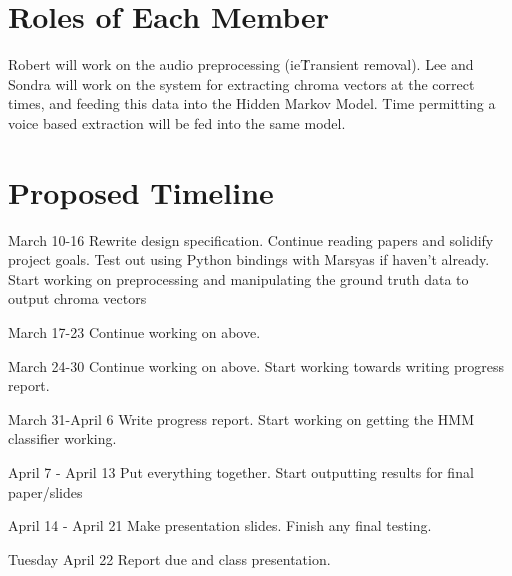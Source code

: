 \documentclass{article}
\begin{document}
\section{Roles of Each Member}

Robert will work on the audio preprocessing (ie\. Transient removal).  Lee and
Sondra will work on the system for extracting chroma vectors at the correct
times, and feeding this data into the Hidden Markov Model. Time permitting a
voice based extraction will be fed into the same model.

\section{Proposed Timeline}\label{sec:timeline}

March 10-16\newline
Rewrite design specification. Continue reading papers and solidify project
goals. Test out using Python bindings with Marsyas if haven't already. Start
working on preprocessing and manipulating the ground truth data to output
chroma vectors
\newline
\newline

March 17-23\newline
Continue working on above.
\newline
\newline

March 24-30\newline
Continue working on above. Start working towards writing progress report.
\newline
\newline

March 31-April 6\newline
Write progress report. Start working on getting the HMM classifier working.
\newline
\newline

April 7 - April 13\newline
Put everything together. Start outputting results for final paper/slides
\newline
\newline

April 14 - April 21\newline
Make presentation slides. Finish any final testing.
\newline
\newline

Tuesday April 22\newline
Report due and class presentation.
\newline
\newline
\end{document}
